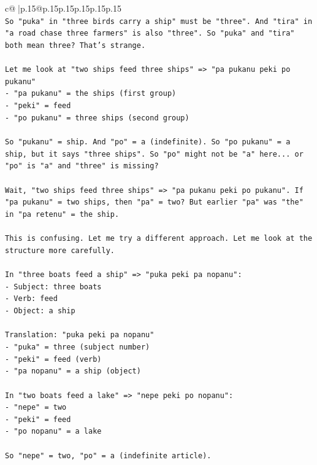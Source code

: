 \documentclass{article}
\begin{document}
{\begin{supertabular}{c@{$\;$}|p{.15\linewidth}@{}p{.15\linewidth}p{.15\linewidth}p{.15\linewidth}p{.15\linewidth}p{.15\linewidth}}
{{{\\ 
\texttt{So "puka" in "three birds carry a ship" must be "three". And "tira" in "a road chase three farmers" is also "three". So "puka" and "tira" both mean three? That's strange.} \\
\\ 
\texttt{Let me look at "two ships feed three ships" => "pa pukanu peki po pukanu"} \\
\texttt{{-} "pa pukanu" = the ships (first group)} \\
\texttt{{-} "peki" = feed} \\
\texttt{{-} "po pukanu" = three ships (second group)} \\
\\ 
\texttt{So "pukanu" = ship. And "po" = a (indefinite). So "po pukanu" = a ship, but it says "three ships". So "po" might not be "a" here... or "po" is "a" and "three" is missing?} \\
\\ 
\texttt{Wait, "two ships feed three ships" => "pa pukanu peki po pukanu". If "pa pukanu" = two ships, then "pa" = two? But earlier "pa" was "the" in "pa retenu" = the ship.} \\
\\ 
\texttt{This is confusing. Let me try a different approach. Let me look at the structure more carefully.} \\
\\ 
\texttt{In "three boats feed a ship" => "puka peki pa nopanu":} \\
\texttt{{-} Subject: three boats} \\
\texttt{{-} Verb: feed} \\
\texttt{{-} Object: a ship} \\
\\ 
\texttt{Translation: "puka peki pa nopanu"} \\
\texttt{{-} "puka" = three (subject number)} \\
\texttt{{-} "peki" = feed (verb)} \\
\texttt{{-} "pa nopanu" = a ship (object)} \\
\\ 
\texttt{In "two boats feed a lake" => "nepe peki po nopanu":} \\
\texttt{{-} "nepe" = two} \\
\texttt{{-} "peki" = feed} \\
\texttt{{-} "po nopanu" = a lake} \\
\\ 
\texttt{So "nepe" = two, "po" = a (indefinite article).} \\
}}}
\end{supertabular}}
\end{document}
